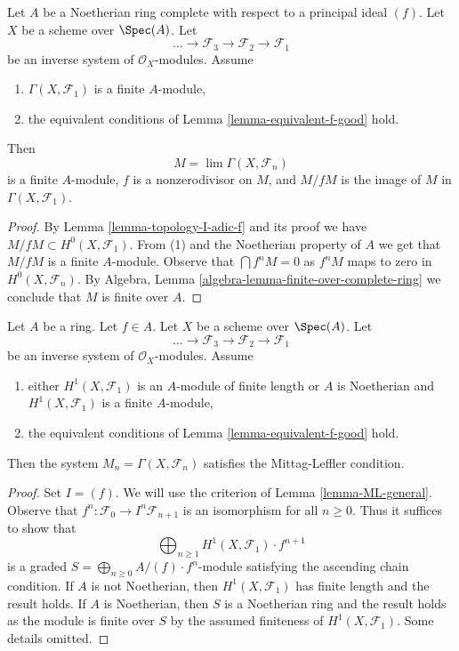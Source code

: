 \begin{lemma}
\label{lemma-limit-finite}
Let $A$ be a Noetherian ring complete with respect to a principal ideal $(f)$.
Let $X$ be a scheme over $\Spec(A)$. Let
$$
\ldots \to \mathcal{F}_3 \to \mathcal{F}_2 \to \mathcal{F}_1
$$
be an inverse system of $\mathcal{O}_X$-modules. Assume
\begin{enumerate}
\item $\Gamma(X, \mathcal{F}_1)$ is a finite $A$-module,
\item the equivalent conditions of Lemma \ref{lemma-equivalent-f-good} hold.
\end{enumerate}
Then
$$
M = \lim \Gamma(X, \mathcal{F}_n)
$$
is a finite $A$-module, $f$ is a nonzerodivisor on $M$, and
$M/fM$ is the image of $M$ in $\Gamma(X, \mathcal{F}_1)$.
\end{lemma}

\begin{proof}
By Lemma \ref{lemma-topology-I-adic-f} and its proof we have
$M/fM \subset H^0(X, \mathcal{F}_1)$. From (1) and the Noetherian
property of $A$ we get that $M/fM$ is a finite $A$-module.
Observe that $\bigcap f^nM = 0$ as $f^nM$ maps to zero in
$H^0(X, \mathcal{F}_n)$. By
Algebra, Lemma \ref{algebra-lemma-finite-over-complete-ring}
we conclude that $M$ is finite over $A$.
\end{proof}

\begin{lemma}
\label{lemma-ML}
Let $A$ be a ring. Let $f \in A$. Let $X$ be a scheme over $\Spec(A)$. Let
$$
\ldots \to \mathcal{F}_3 \to \mathcal{F}_2 \to \mathcal{F}_1
$$
be an inverse system of $\mathcal{O}_X$-modules. Assume
\begin{enumerate}
\item either $H^1(X, \mathcal{F}_1)$ is an $A$-module of finite length
or $A$ is Noetherian and $H^1(X, \mathcal{F}_1)$ is a finite $A$-module,
\item the equivalent conditions of Lemma \ref{lemma-equivalent-f-good} hold.
\end{enumerate}
Then the system $M_n = \Gamma(X, \mathcal{F}_n)$ satisfies the
Mittag-Leffler condition.
\end{lemma}

\begin{proof}
Set $I = (f)$. We will use the criterion of Lemma \ref{lemma-ML-general}.
Observe that $f^n : \mathcal{F}_0 \to I^n\mathcal{F}_{n + 1}$
is an isomorphism for all $n \geq 0$.
Thus it suffices to show that
$$
\bigoplus\nolimits_{n \geq 1} H^1(X, \mathcal{F}_1) \cdot f^{n + 1}
$$
is a graded $S = \bigoplus_{n \geq 0} A/(f) \cdot f^n$-module satisfying the
ascending chain condition. If $A$ is not Noetherian, then
$H^1(X, \mathcal{F}_1)$ has finite length and the result holds.
If $A$ is Noetherian, then $S$ is a Noetherian ring and the result
holds as the module is finite over $S$ by the assumed finiteness
of $H^1(X, \mathcal{F}_1)$. Some details omitted.
\end{proof}

